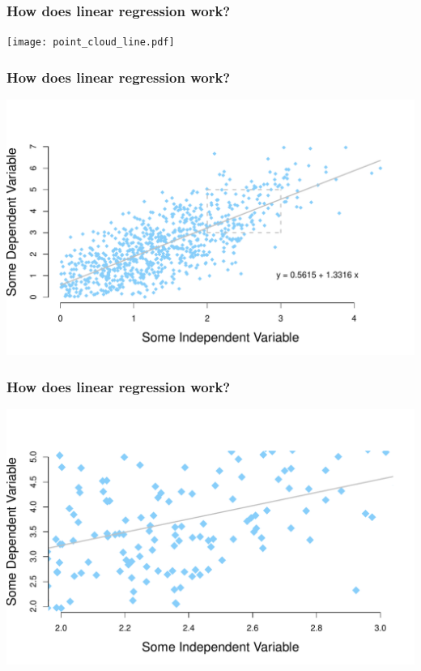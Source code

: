 \documentclass[aspectratio=169]{beamer}
\theoremstyle{principle}
\begin{document}
\begin{frame}
\frametitle{How does linear regression work?}
\begin{center}
\texttt{[image: point\_cloud\_line.pdf]}
\end{center}

\end{frame}

\begin{frame}
\frametitle{How does linear regression work?}
\begin{center}
\includegraphics[scale=0.6]{point_cloud_line_box.pdf}
\end{center}

\end{frame}

\begin{frame}
\frametitle{How does linear regression work?}
\begin{center}
\includegraphics[scale=0.6]{point_cloud_line_zoomed.pdf}
\end{center}

\end{frame}
\end{document}

